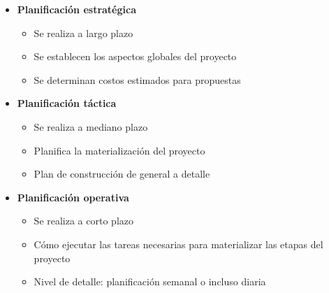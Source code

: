 \documentclass{article} %
\begin{document}
\begin{itemize}[label={},left=0pt,align=parleft]
    \item \begin{highlightbox}[levelone] \textbf{Planificación estratégica} \end{highlightbox}
    \begin{itemize}[label={},left=1em,align=parleft]
        \item \begin{highlightbox}[leveltwo] Se realiza a largo plazo \end{highlightbox}
        \item \begin{highlightbox}[leveltwo] Se establecen los aspectos globales del proyecto \end{highlightbox}
        \item \begin{highlightbox}[leveltwo] Se determinan costos estimados para propuestas \end{highlightbox}
    \end{itemize}
    \item \begin{highlightbox}[levelone] \textbf{Planificación táctica} \end{highlightbox}
    \begin{itemize}[label={},left=1em,align=parleft]
        \item \begin{highlightbox}[leveltwo] Se realiza a mediano plazo \end{highlightbox}
        \item \begin{highlightbox}[leveltwo] Planifica la materialización del proyecto \end{highlightbox}
        \item \begin{highlightbox}[leveltwo] Plan de construcción de general a detalle \end{highlightbox}
    \end{itemize}
    \item \begin{highlightbox}[levelone] \textbf{Planificación operativa} \end{highlightbox}
    \begin{itemize}[label={},left=1em,align=parleft]
        \item \begin{highlightbox}[leveltwo] Se realiza a corto plazo \end{highlightbox}
        \item \begin{highlightbox}[leveltwo] Cómo ejecutar las tareas necesarias para materializar las etapas del proyecto \end{highlightbox}
        \item \begin{highlightbox}[leveltwo] Nivel de detalle: planificación semanal o incluso diaria \end{highlightbox}
    \end{itemize}
\end{itemize}
\end{document}
